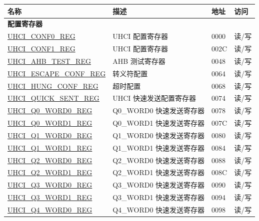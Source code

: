 \begin{longtable}{ | p{6cm} | p{7.2cm} | p{1.3cm} | p{1cm} | }
\hline\rowcolor{lightgray}
名称 & 描述 &  地址 & 访问 \\ \hline
\endhead
\multicolumn{4}{|l|}{\textbf{配置寄存器}} \\ \hline
\hyperref[regdesc:UHCICONF0REG]{UHCI\_CONF0\_REG} & UHCI 配置寄存器 & \hexprefix{}0000 & 读/写 \\ \hline
\hyperref[regdesc:UHCICONF1REG]{UHCI\_CONF1\_REG} & UHCI 配置寄存器 & \hexprefix{}002C & 读/写 \\ \hline
\hyperref[regdesc:UHCIAHBTESTREG]{UHCI\_AHB\_TEST\_REG} & AHB 测试寄存器 & \hexprefix{}0048 & 读/写 \\ \hline
\hyperref[regdesc:UHCIESCAPECONFREG]{UHCI\_ESCAPE\_CONF\_REG} & 转义符配置 & \hexprefix{}0064 & 读/写 \\ \hline
\hyperref[regdesc:UHCIHUNGCONFREG]{UHCI\_HUNG\_CONF\_REG} & 超时配置 & \hexprefix{}0068 & 读/写 \\ \hline
\hyperref[regdesc:UHCIQUICKSENTREG]{UHCI\_QUICK\_SENT\_REG} & UHCI 快速发送配置寄存器 & \hexprefix{}0074 & 读/写 \\ \hline
\hyperref[regdesc:UHCIQ0WORD0REG]{UHCI\_Q0\_WORD0\_REG} & Q0\_WORD0 快速发送寄存器 & \hexprefix{}0078 & 读/写 \\ \hline
\hyperref[regdesc:UHCIQ0WORD1REG]{UHCI\_Q0\_WORD1\_REG} & Q0\_WORD1 快速发送寄存器 & \hexprefix{}007C & 读/写 \\ \hline
\hyperref[regdesc:UHCIQ1WORD0REG]{UHCI\_Q1\_WORD0\_REG} & Q1\_WORD0 快速发送寄存器 & \hexprefix{}0080 & 读/写 \\ \hline
\hyperref[regdesc:UHCIQ1WORD1REG]{UHCI\_Q1\_WORD1\_REG} & Q1\_WORD1 快速发送寄存器 & \hexprefix{}0084 & 读/写 \\ \hline
\hyperref[regdesc:UHCIQ2WORD0REG]{UHCI\_Q2\_WORD0\_REG} & Q2\_WORD0 快速发送寄存器 & \hexprefix{}0088 & 读/写 \\ \hline
\hyperref[regdesc:UHCIQ2WORD1REG]{UHCI\_Q2\_WORD1\_REG} & Q2\_WORD1 快速发送寄存器 & \hexprefix{}008C & 读/写 \\ \hline
\hyperref[regdesc:UHCIQ3WORD0REG]{UHCI\_Q3\_WORD0\_REG} & Q3\_WORD0 快速发送寄存器 & \hexprefix{}0090 & 读/写 \\ \hline
\hyperref[regdesc:UHCIQ3WORD1REG]{UHCI\_Q3\_WORD1\_REG} & Q3\_WORD1 快速发送寄存器 & \hexprefix{}0094 & 读/写 \\ \hline
\hyperref[regdesc:UHCIQ4WORD0REG]{UHCI\_Q4\_WORD0\_REG} & Q4\_WORD0 快速发送寄存器 & \hexprefix{}0098 & 读/写 \\ \hline

\end{longtable}
